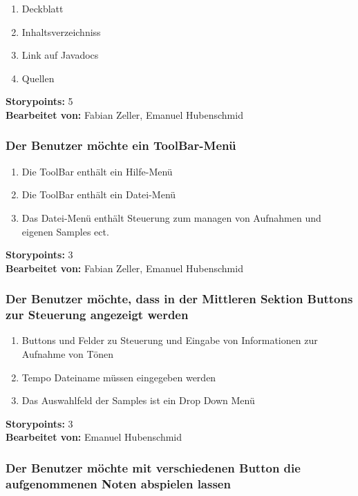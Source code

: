 \begin{enumerate}
 \item Deckblatt
 \item Inhaltsverzeichniss
 \item Link auf Javadocs
 \item Quellen
\end{enumerate}

\textbf{Storypoints:} 5 \\
\textbf{Bearbeitet von: } Fabian Zeller, Emanuel Hubenschmid \\


\subsubsection{Der Benutzer möchte ein ToolBar-Menü}

\begin{enumerate}
 \item Die ToolBar enthält ein Hilfe-Menü
 \item Die ToolBar enthält ein Datei-Menü
 \item Das Datei-Menü enthält Steuerung zum managen von Aufnahmen und eigenen Samples ect.
\end{enumerate}

\textbf{Storypoints:} 3 \\
\textbf{Bearbeitet von: } Fabian Zeller, Emanuel Hubenschmid \\


\subsubsection{Der Benutzer möchte, dass in der Mittleren Sektion Buttons zur Steuerung angezeigt 
werden}

\begin{enumerate}
 \item Buttons und Felder zu Steuerung und Eingabe von Informationen zur Aufnahme von Tönen
 \item Tempo Dateiname müssen eingegeben werden
 \item Das Auswahlfeld der Samples ist ein Drop Down Menü
\end{enumerate}

\textbf{Storypoints:} 3 \\
\textbf{Bearbeitet von: } Emanuel Hubenschmid \\


\subsubsection{Der Benutzer möchte mit verschiedenen Button die aufgenommenen Noten abspielen 
lassen}


